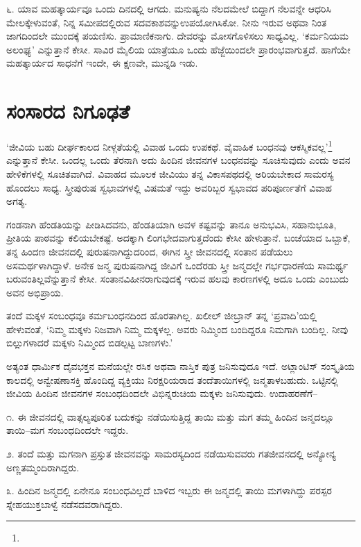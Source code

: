 ೬. ಯಾವ ಮಹತ್ಕಾರ್ಯವೂ ಒಂದು ದಿನದಲ್ಲಿ ಆಗದು. ಮನುಷ್ಯನು ನೆಲದಮೇಲೆ ಬಿದ್ದಾಗ ನೆಲವನ್ನೇ ಆಧರಿಸಿ ಮೇಲಕ್ಕೇಳುವಂತೆ, ನಿನ್ನ ಸಮೀಪದಲ್ಲಿರುವ ಸದವಕಾಶವನ್ನು\break ಉಪಯೋಗಿಸಿಕೋ. ನೀನು ಇರುವ ಅಥವಾ ನಿಂತ ಜಾಗದಿಂದಲೇ ಮುಂದಕ್ಕೆ ಪಯಣಿಸು. ಪ್ರಾಮಾಣಿಕನಾಗು. ದೇವರನ್ನು ಮೋಸಗೊಳಿಸಲು ಸಾಧ್ಯವಿಲ್ಲ. ‘ಕರ್ಮನಿಯಮ ಅಲಂಘ್ಯ’ ಎನ್ನುತ್ತಾನೆ ಕೇಸೀ. ಸಾವಿರ ಮೈಲಿಯ ಯಾತ್ರೆಯೂ ಒಂದು ಹೆಜ್ಜೆಯಿಂದಲೇ ಪ್ರಾರಂಭವಾಗುತ್ತದೆ. ಹಾಗೆಯೇ ಮಹತ್ಕಾರ್ಯದ ಸಾಧನೆಗೆ ಇಂದೇ, ಈ ಕ್ಷಣವೇ, ಮುನ್ನಡಿ ಇಡು.


\section*{ಸಂಸಾರದ ನಿಗೂಢತೆ}


‘ಜೀವಿಯ ಬಹು ದೀರ್ಘಕಾಲದ ನೀಳ್ಗತೆಯಲ್ಲಿ ವಿವಾಹ ಒಂದು ಉಪಕಥೆ. ವೈವಾಹಿಕ ಬಂಧನವು ಆಕಸ್ಮಿಕವಲ್ಲ’\footnote{} ಎನ್ನುತ್ತಾನೆ ಕೇಸೀ. ಒಂದಲ್ಲ ಒಂದು ತೆರನಾಗಿ ಅದು ಹಿಂದಿನ ಜೀವನಗಳ ಬಂಧನವನ್ನು ಸೂಚಿಸುವುದು ಎಂದು ಅವನ ಹೇಳಿಕೆಗಳಲ್ಲಿ ಸೂಚಿತವಾಗಿದೆ. ವಿವಾಹದ ಮೂಲಕ ಜೀವಿಯು ತನ್ನ ವಿಕಾಸಪಥದಲ್ಲಿ ಅರಿಯಬೇಕಾದ ಸಾಮರಸ್ಯ ಹೊಂದಲು ಸಾಧ್ಯ. ಸ್ತ್ರೀಪುರುಷ ಸ್ವಭಾವಗಳಲ್ಲಿ ವಿಷಮತೆ ಇದ್ದು ಅವರಿಬ್ಬರ ಸ್ವಭಾವದ ಪರಿಪೂರ್ಣತೆಗೆ ವಿವಾಹ ಅಗತ್ಯ.

ಗಂಡನಾಗಿ ಹೆಂಡತಿಯನ್ನು ಪೀಡಿಸಿದವನು, ಹೆಂಡತಿಯಾಗಿ ಅವಳ ಕಷ್ಟವನ್ನು ತಾನೂ ಅನುಭವಿಸಿ, ಸಹಾನುಭೂತಿ, ಪ್ರೀತಿಯ ಪಾಠವನ್ನು ಕಲಿಯಬೇಕಷ್ಟೆ. ಅದಕ್ಕಾಗಿ ಲಿಂಗಭೇದ\-ವಾಗುತ್ತ\-ದೆಂದು ಕೇಸೀ ಹೇಳುತ್ತಾನೆ. ಬಂಜೆಯಾದ ಒಬ್ಬಾಕೆ, ತನ್ನ ಹಿಂದಣ ಜೀವನದಲ್ಲಿ ಪುರುಷನಾಗಿದ್ದುದರಿಂದ, ಈಗಿನ ಸ್ತ್ರೀ ಜೀವನದಲ್ಲಿ ಸಂತಾನ ಪಡೆಯಲು ಅಸಮರ್ಥಳಾಗಿದ್ದಾಳೆ. ಅನೇಕ ಜನ್ಮ ಪುರುಷನಾಗಿದ್ದ ಜೀವಿಗೆ ಒಂದೆರಡು ಸ್ತ್ರೀ ಜನ್ಮದಲ್ಲೇ ಗರ್ಭಧಾರಣೆಯ ಸಾಮರ್ಥ್ಯ ಬರುವಂತಿಲ್ಲವೆನ್ನುತ್ತಾನೆ ಕೇಸೀ. ಸಂತಾನವಿಹೀನರಾಗುವುದಕ್ಕೆ ಇರುವ ಹಲವು ಕಾರಣಗಳಲ್ಲಿ ಅದೂ ಒಂದು ಎಂಬುದು ಅವನ ಅಭಿಪ್ರಾಯ.

ತಂದೆ ಮಕ್ಕಳ ಸಂಬಂಧವೂ ಕರ್ಮಬಂಧನದಿಂದ ಹೊರತಾಗಿಲ್ಲ. ಖಲೀಲ್ ಜೀಬ್ರಾನ್ ತನ್ನ ‘ಪ್ರವಾದಿ’ಯಲ್ಲಿ ಹೇಳುವಂತೆ, ‘ನಿಮ್ಮ ಮಕ್ಕಳು ನಿಜವಾಗಿ ನಿಮ್ಮ ಮಕ್ಕಳಲ್ಲ. ಅವರು ನಿಮ್ಮಿಂದ ಬಂದಿದ್ದರೂ ನಿಮಗಾಗಿ ಬಂದಿಲ್ಲ. ನೀವು ಬಿಲ್ಲುಗಳಾದರೆ ಮಕ್ಕಳು ನಿಮ್ಮಿಂದ ಬಿಡಲ್ಪಟ್ಟ ಬಾಣಗಳು.’

ಅತ್ಯಂತ ಧಾರ್ಮಿಕ ದೈವಭಕ್ತನ ಮನೆಯಲ್ಲೇ ರಸಿಕ ಅಥವಾ ನಾಸ್ತಿಕ ಪುತ್ರ ಜನಿಸುವುದೂ ಇದೆ. ಅಟ್ಲಾಂಟಿಸ್ ಸಂಸ್ಕೃತಿಯ ಕಾಲದಲ್ಲಿ ಅನ್ವೇಷಣಾಸಕ್ತಿ ಹೊಂದಿದ್ದ ವ್ಯಕ್ತಿಯು ನಿರಕ್ಷರಿಯ\-ರಾದ ತಂದೆತಾಯಿಗಳಲ್ಲಿ ಜನ್ಮತಾಳಬಹುದು. ಒಟ್ಟಿನಲ್ಲಿ ಜೀವಿಯ ಹಿಂದಿನ ಜೀವನಗಳ ಸಂಬಂಧ\-ದಿಂದಲೇ ವಿಭಿನ್ನರುಚಿಯ ಮಕ್ಕಳು ಜನಿಸುವುದು. ಉದಾಹರಣೆಗೆ–

೧. ಈ ಜೀವನದಲ್ಲಿ ವಾತ್ಸಲ್ಯಪೂರಿತ ಬದುಕನ್ನು ನಡೆಯಿಸುತ್ತಿದ್ದ ತಾಯಿ ಮತ್ತು ಮಗ ತಮ್ಮ ಹಿಂದಿನ ಜನ್ಮದಲ್ಲೂ ತಾಯಿ–ಮಗ ಸಂಬಂಧದಿಂದಲೇ ಇದ್ದರು.

೨. ತಂದೆ ಮತ್ತು ಮಗನಾಗಿ ಪ್ರಸ್ತುತ ಜೀವನವನ್ನು ಸಾಮರಸ್ಯದಿಂದ ನಡೆಯಿಸುವವರು ಗತಜೀವನದಲ್ಲಿ ಅನ್ಯೋನ್ಯ ಅಣ್ಣತಮ್ಮಂದಿರಾಗಿದ್ದರು.

೩. ಹಿಂದಿನ ಜನ್ಮದಲ್ಲಿ ಏನೇನೂ ಸಂಬಂಧವಿಲ್ಲದೆ ಬಾಳಿದ ಇಬ್ಬರು ಈ ಜನ್ಮದಲ್ಲಿ ತಾಯಿ ಮಗಳಾಗಿದ್ದು ಪರಸ್ಪರ ಸ್ನೇಹಯುಕ್ತಬಾಳ್ವೆ ನಡೆಸದವರಾಗಿದ್ದರು.

